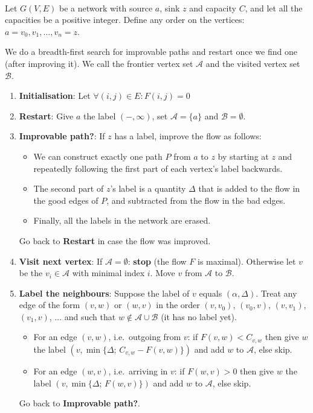\begin{code}\label{maxflow}~\\
Let $G(V,E)$ be a network with source $a$, sink $z$ and capacity $C$,
and let all the capacities be a positive integer. Define any order on
the vertices: $a = v_{0}, v_{1}, \ldots, v_{n} = z$.

We do a breadth-first search for improvable paths and restart once we find one (after improving it). We call the frontier vertex set $\mathcal{A}$ and the visited vertex set $\mathcal{B}$.

\begin{enumerate}
	\item \textbf{Initialisation}: Let $\forall (i,j) \in E: F(i,j) = 0$
	
	\item \textbf{Restart}: Give $a$ the label $(-,\infty)$, set $\mathcal{A} = \{a\}$ and $\mathcal{B} = \emptyset$.
	
	\item \textbf{Improvable path?}: If $z$ has a label, improve the flow as follows:
	\begin{itemize}
		\item We can construct exactly one path $P$ from
	$a$ to $z$ by starting at $z$
	and repeatedly following the first part of each vertex's label backwards.
		\item The second part of $z$'s label is a quantity $\Delta$
	that is added to the flow in the good edges of $P$, and subtracted
	from the flow in the bad edges.
		\item Finally, all the labels in the network are erased.
	\end{itemize}
	Go back to \textbf{Restart} in case the flow was improved.
	
	\item \textbf{Visit next vertex}: If $\mathcal{A} = \emptyset$: \textbf{stop} (the flow $F$ is maximal).
	Otherwise let $v$ be the $v_{i} \in \mathcal{A}$ with minimal
	index $i$. Move $v$ from $\mathcal{A}$ to $\mathcal{B}$.
	
	\item \textbf{Label the neighbours}: Suppose the label of $v$ equals
	$(\alpha,\Delta)$. Treat any edge of the form $(v,w)$ or $(w,v)$ in
	the order $(v,v_{0})$, $(v_{0},v)$, $(v,v_{1})$, $(v_{1},v)$, $\ldots
	$ and such that $w\notin \mathcal{A}\cup\mathcal{B}$ (it has no label yet).
	\begin{itemize}
		\item For an edge $(v,w)$, i.e.\ outgoing from $v$:
		if $F(v,w) < C_{v,w}$ then give $w$ the label $(v,\min\{\Delta;\,C_{v,w}-F(v,w)\})$ and add $w$ to $\mathcal{A}$, else skip.
		
		\item For an edge $(w,v)$, i.e.\ arriving in $v$:
		if $F(w,v) > 0$ then give $w$ the label $(v,\min\{\Delta;\,F(w,v)\})$ and add $w$ to $\mathcal{A}$, else skip.
	\end{itemize}
	Go back to \textbf{Improvable path?}.
\end{enumerate}
\end{code}

